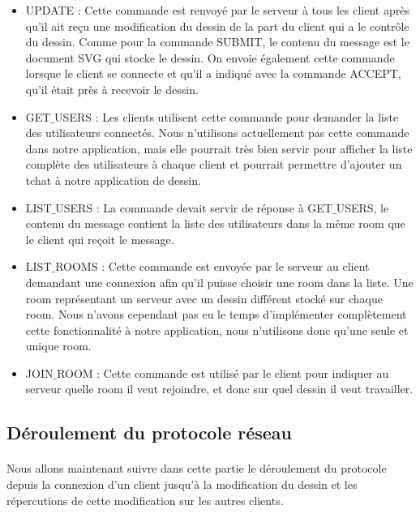 \documentclass[a4paper,11pt]{article}
\begin{document}
\begin{itemize}
\item UPDATE : Cette commande est renvoyé par le serveur à tous les client après qu'il ait reçu une modification du dessin de la part du client qui a le contrôle du dessin. Comme pour la commande SUBMIT, le contenu du message est le document SVG qui stocke le dessin.
On envoie également cette commande lorsque le client se connecte et qu'il a indiqué avec la commande ACCEPT, qu'il était près à recevoir le dessin.

\item GET$\_$USERS : Les clients utilisent cette commande pour demander la liste des utilisateurs connectés. Nous n'utilisons actuellement pas cette commande dans notre application, mais elle pourrait très bien servir pour afficher la liste complète des utilisateurs à chaque client et pourrait permettre d'ajouter un tchat à notre application de dessin.

\item LIST$\_$USERS : La commande devait servir de réponse à GET$\_$USERS, le contenu du message contient la liste des utilisateurs dans la même room que le client qui reçoit le message.

\item LIST$\_$ROOMS : Cette commande est envoyée par le serveur au client demandant une connexion afin qu'il puisse choisir une room dans la liste. Une room représentant un serveur avec un dessin différent stocké sur chaque room.
Nous n'avons cependant pas eu le temps d'implémenter complètement cette fonctionnalité à notre application, nous n'utilisons donc qu'une seule et unique room.

\item JOIN$\_$ROOM : Cette commande est utilisé par le client pour indiquer au serveur quelle room il veut rejoindre, et donc sur quel dessin il veut travailler.
\end{itemize}

\subsection{Déroulement du protocole réseau}
\paragraph{}Nous allons maintenant suivre dans cette partie le déroulement du protocole depuis la connexion d'un client jusqu'à la modification du dessin et les répercutions de cette modification sur les autres clients.
\end{document}
